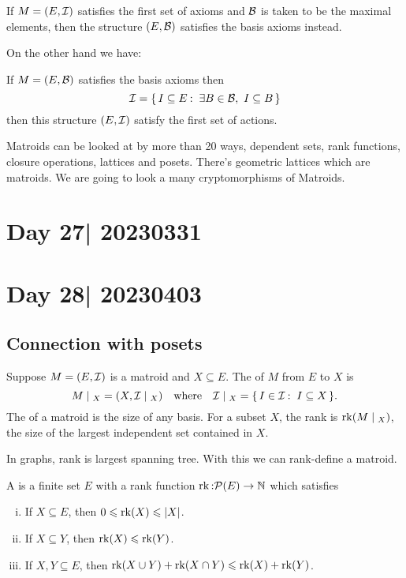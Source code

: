 \documentclass[12pt]{memoir}
\begin{document}
\begin{Lem}
    If $M=(E,\mathcal{I})$ satisfies the first set of axioms and $\mathcal{B}$ is taken to be the maximal elements, then the structure $(E,\mathcal{B})$ satisfies the basis axioms instead.
\end{Lem}

On the other hand we have:

\begin{Lem}
    If $M=(E,\mathcal{B})$ satisfies the basis axioms then 
    $$\cI=\set{I\subseteq E\:\ \exists B\in\cB,\ I\subseteq B}$$
    then this structure $(E,\mathcal{I})$ satisfy the first set of actions.
\end{Lem}

Matroids can be looked at by more than 20 ways, dependent sets, rank functions, closure operations, lattices and posets. There's geometric lattices which are matroids. We are going to look a many cryptomorphisms of Matroids. 
\section{Day 27| 20230331}
\section{Day 28| 20230403}
\subsection{Connection with posets}
\begin{Def}
    Suppose $M=(E,\mathcal{I})$ is a matroid and $X\subseteq E$. The  of $M$ from $E$ to $X$ is 
    $$M\mid_{X}=(X,\cI\mid_X)\word{where}\cI\mid_X=\set{I\in\cI\:\ I\subseteq X}.$$
    The  of a matroid is the size of any basis. For a subset $X$, the rank is $\rk(M\mid_X)$, the size of the largest independent set contained in $X$.
\end{Def}

In graphs, rank is largest spanning tree. With this we can rank-define a matroid.

\begin{Def}
    A  is a finite set $E$ with a rank function $\operatorname{rk}\mathbin{:} \mathcal{P}(E)\to\mathbb{N}$ which satisfies 
    \begin{enumerate}[i)]
        \itemsep=-0.4em
        \item If $X\subseteq E$, then $0\leqslant\operatorname{rk}(X)\leqslant|X|$.
        \item If $X\subseteq Y$, then $\operatorname{rk}(X)\leqslant\operatorname{rk}(Y)$.
        \item If $X,Y\subseteq E$, then $\operatorname{rk}(X\cup Y)+\operatorname{rk}(X\cap Y)\leqslant\operatorname{rk}(X)+\operatorname{rk}(Y)$.
    \end{enumerate}
\end{Def}
\end{document}
